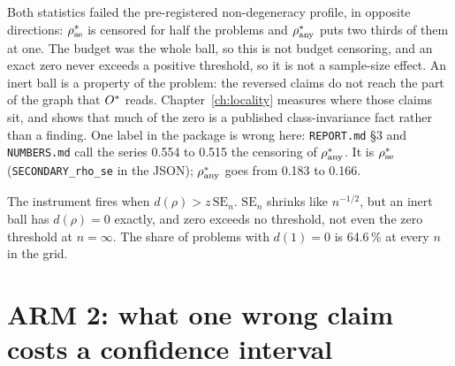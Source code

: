 Both statistics failed the pre-registered non-degeneracy profile, in opposite directions:
$\rho^{*}_{\mathrm{se}}$ is censored for half the problems and $\rho^{*}_{\mathrm{any}}$ puts two
thirds of them at one. The budget was the whole ball, so this is not budget censoring, and an exact
zero never exceeds a positive threshold, so it is not a sample-size effect. An inert ball is a
property of the problem: the reversed claims do not reach the part of the graph that $O^{*}$ reads.
Chapter~\ref{ch:locality} measures where those claims sit, and shows that much of the zero is a
published class-invariance fact rather than a finding. One label in the package is wrong here:
\texttt{REPORT.md} \S3 and \texttt{NUMBERS.md} call the series 0.554 to 0.515 the censoring of
$\rho^{*}_{\mathrm{any}}$. It is $\rho^{*}_{\mathrm{se}}$ (\texttt{SECONDARY\_rho\_se} in the JSON);
$\rho^{*}_{\mathrm{any}}$ goes from 0.183 to 0.166.


%
{The instrument fires when $d(\rho) > z\,\mathrm{SE}_n$. $\mathrm{SE}_n$ shrinks like $n^{-1/2}$,
but an inert ball has $d(\rho) = 0$ exactly, and zero exceeds no threshold, not even the zero
threshold at $n = \infty$. The share of problems with $d(1) = 0$ is 64.6\,\% at every $n$ in the
grid.}

\begin{antes}
\end{antes}

\section{ARM 2: what one wrong claim costs a confidence interval}

